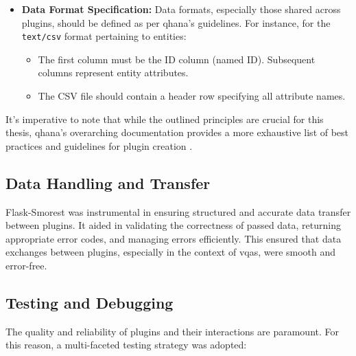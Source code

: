 \documentclass[
  a4paper,  %
  twoside,  %
  bibliography=totoc,
  headsepline,
  cleardoublepage=empty,
  parskip=half,
  draft=false
]{scrbook}
\begin{document}
\begin{itemize}
    \item \textbf{Data Format Specification:}
    Data formats, especially those shared across plugins, should be defined as per \gls{qhana}'s guidelines.
    For instance, for the \texttt{text/csv} format pertaining to entities:
    \begin{itemize}
        \item The first column must be the ID column (named ID). Subsequent columns represent entity attributes.
        \item The CSV file should contain a header row specifying all attribute names.
    \end{itemize}
\end{itemize}

It's imperative to note that while the outlined principles are crucial for this thesis, \gls{qhana}'s overarching documentation provides a more exhaustive list of best practices and guidelines for plugin creation \cite{Buehler2022}.



\subsection{Data Handling and Transfer}
Flask-Smorest was instrumental in ensuring structured and accurate data transfer between plugins.
It aided in validating the correctness of passed data, returning appropriate error codes, and managing errors efficiently.
This ensured that data exchanges between plugins, especially in the context of \glspl{vqa}, were smooth and error-free.

\subsection{Testing and Debugging}

The quality and reliability of plugins and their interactions are paramount.
For this reason, a multi-faceted testing strategy was adopted:
\end{document}
